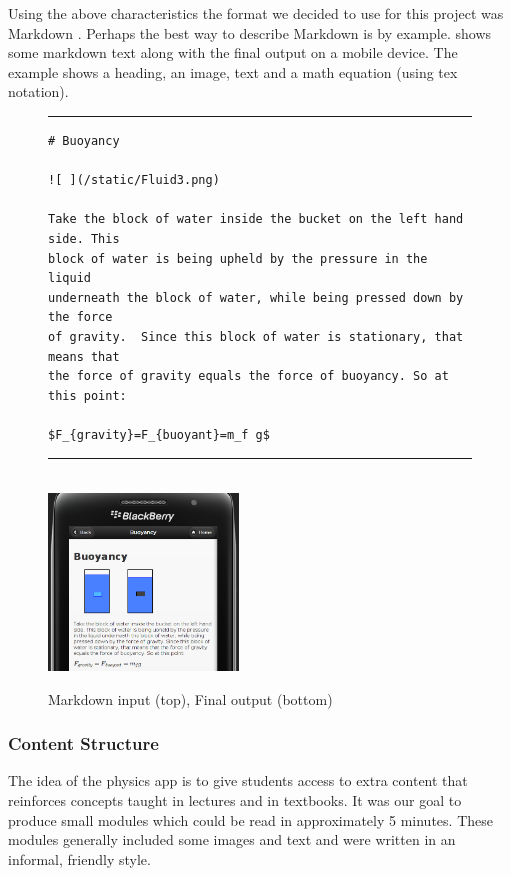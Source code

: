\documentclass[12pt,a4paper]{article}  %
\begin{document}
Using the above characteristics the format we decided to use for this project was Markdown \cite{md}. Perhaps the best way to describe Markdown is by example.  shows some markdown text along with the final output on a mobile device. The example shows a heading, an image, text and a math equation (using tex notation).

\begin{figure}[htb]
\rule[0.5ex]{1\columnwidth}{1pt}
\footnotesize
\begin{verbatim}
# Buoyancy

![ ](/static/Fluid3.png)

Take the block of water inside the bucket on the left hand side. This
block of water is being upheld by the pressure in the liquid
underneath the block of water, while being pressed down by the force
of gravity.  Since this block of water is stationary, that means that
the force of gravity equals the force of buoyancy. So at this point:

$F_{gravity}=F_{buoyant}=m_f g$
\end{verbatim}
\rule[0.5ex]{1\columnwidth}{1pt}
\\[2mm]
\centering
\includegraphics[width=0.45\textwidth]{buoyancy.png}
\caption{Markdown input (top), Final output (bottom)}
\label{fig:md}
\end{figure}

\subsubsection{Content Structure}

The idea of the physics app is to give students access to extra content that reinforces concepts taught in lectures and in textbooks. It was our goal to produce small modules which could be read in approximately 5 minutes. These modules generally included some images and text and were written in an informal, friendly style.
\end{document}

